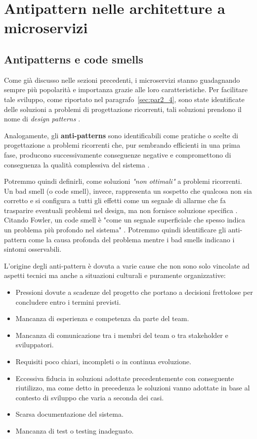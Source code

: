 \chapter{Antipattern nelle architetture a microservizi}

\section{Antipatterns e code smells}
Come già discusso nelle sezioni precedenti, i microservizi stanno guadagnando sempre più popolarità e importanza grazie alle loro caratteristiche. Per facilitare tale sviluppo, come riportato nel paragrafo~\ref{sec:par2_4}, sono state identificate delle soluzioni a problemi di progettazione ricorrenti, tali soluzioni prendono il nome di \textit{design patterns} \cite{CernyCatalogo}.

Analogamente, gli \textbf{anti-patterns} sono identificabili come pratiche o scelte di progettazione a problemi ricorrenti che, pur sembrando efficienti in una prima fase, producono successivamente conseguenze negative e compromettono di conseguenza la qualità complessiva del sistema \cite{CernyCatalogo}.

Potremmo quindi definirli, come soluzioni \textit{"non ottimali"} a problemi ricorrenti. Un bad smell (o code smell), invece, rappresenta un sospetto che qualcosa non sia corretto e si configura a tutti gli effetti come un segnale di allarme che fa trasparire eventuali problemi nel design, ma non fornisce soluzione specifica \cite{CernyCatalogo}.
Citando Fowler, un code smell è "come un segnale superficiale che spesso indica un problema più profondo nel sistema" \cite{fowler_codesmell}.
Potremmo quindi identificare gli anti-pattern come la causa profonda del problema mentre i bad smells indicano i sintomi osservabili. 

L'origine degli anti-pattern è dovuta a varie cause che non sono solo vincolate ad aspetti tecnici ma anche a situazioni culturali e puramente organizzative:
\begin{itemize}
    \item Pressioni dovute a scadenze del progetto che portano a decisioni frettolose per concludere entro i termini previsti. 
    \item Mancanza di esperienza e competenza da parte del team.
    \item Mancanza di comunicazione tra i membri del team o tra stakeholder e sviluppatori. 
    \item Requisiti poco chiari, incompleti o in continua evoluzione. 
    \item Eccessiva fiducia in soluzioni adottate precedentemente con conseguente riutilizzo, ma come detto in precedenza le soluzioni vanno adottate in base al contesto di sviluppo che varia a seconda dei casi. 
    \item Scarsa documentazione del sistema. 
    \item Mancanza di test o testing inadeguato. 
\end{itemize}


